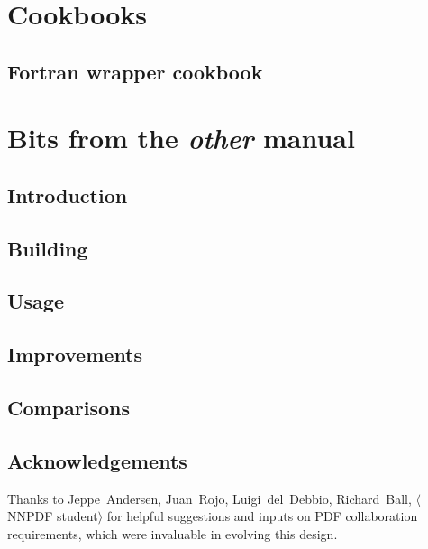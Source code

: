 \documentclass[11pt]{memoir}
\begin{document}
\chapter{Cookbooks}

\section{Fortran wrapper cookbook}



\chapter{Bits from the \emph{other} manual}



\section{Introduction}


\section{Building}


\section{Usage}


\section{Improvements}


\section{Comparisons}


\section{Acknowledgements}

Thanks to Jeppe~Andersen, Juan~Rojo, Luigi~del~Debbio, Richard~Ball,
$\langle$NNPDF student$\rangle$ for helpful suggestions and inputs on PDF
collaboration requirements, which were invaluable in evolving this design.
\end{document}
